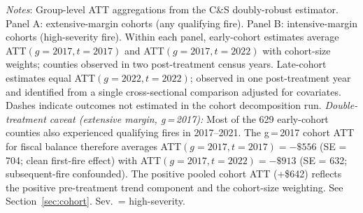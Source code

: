 \documentclass[12pt]{article}
\begin{document}
\begin{table}[h!]
\begin{threeparttable}
\begin{tablenotes}[flushleft]
\small
\item \textit{Notes}: Group-level ATT aggregations from the C\&S doubly-robust
estimator. Panel A: extensive-margin cohorts (any qualifying fire). Panel B:
intensive-margin cohorts (high-severity fire). Within each panel, early-cohort
estimates average ATT$(g{=}2017, t{=}2017)$ and ATT$(g{=}2017, t{=}2022)$ with
cohort-size weights; counties observed in two post-treatment census years.
Late-cohort estimates equal ATT$(g{=}2022, t{=}2022)$; observed in one post-treatment
year and identified from a single cross-sectional comparison adjusted for covariates.
Dashes indicate outcomes not estimated in the cohort decomposition run.
\textit{Double-treatment caveat (extensive margin, g\,=\,2017):} Most of the
629 early-cohort counties also experienced qualifying fires in 2017--2021.
The g\,=\,2017 cohort ATT for fiscal balance therefore averages
ATT$(g{=}2017, t{=}2017) = {-}\$556$ (SE = 704; clean first-fire effect) with
ATT$(g{=}2017, t{=}2022) = {-}\$913$ (SE = 632; subsequent-fire confounded).
The positive pooled cohort ATT (+\$642) reflects the positive pre-treatment trend
component and the cohort-size weighting. See Section~\ref{sec:cohort}.
Sev.\ = high-severity.
\end{tablenotes}
\end{threeparttable}
\end{table}

\clearpage
\end{document}
